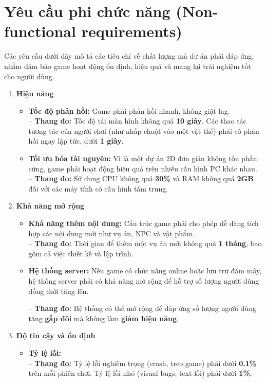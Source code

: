 \section{Yêu cầu phi chức năng (Non-functional requirements)}
Các yêu cầu dưới đây mô tả các tiêu chí về chất lượng mà dự án phải đáp ứng, nhằm đảm bảo game hoạt động ổn định, hiệu quả và mang lại trải nghiệm tốt cho người dùng.

\begin{enumerate}
    \item \textbf{Hiệu năng}
    \begin{itemize}
        \item \textbf{Tốc độ phản hồi:} 
        Game phải phản hồi nhanh, không giật lag. \\
        -- \textbf{Thang đo:} 
        Tốc độ tải màn hình không quá \textbf{10 giây}. Các thao tác tương tác của người chơi (như nhấp chuột vào một vật thể) phải có phản hồi ngay lập tức, dưới \textbf{1 giây}.

        \item \textbf{Tối ưu hóa tài nguyên:}
        Vì là một dự án 2D đơn giản không tốn phần cứng, game phải hoạt động hiệu quả trên nhiều cấu hình PC khác nhau. \\
        -- \textbf{Thang đo:}
        Sử dụng CPU không quá \textbf{30\%} và RAM không quá \textbf{2GB} đối với các máy tính có cấu hình tầm trung.
    \end{itemize}

    \item \textbf{Khả năng mở rộng}
    \begin{itemize}
        \item \textbf{Khả năng thêm nội dung:}
        Cấu trúc game phải cho phép dễ dàng tích hợp các nội dung mới như vụ án, NPC và vật phẩm. \\
        -- \textbf{Thang đo:} Thời gian để thêm một vụ án mới không quá \textbf{1 tháng}, bao gồm cả việc thiết kế và lập trình.

        \item \textbf{Hệ thống server:}
        Nếu game có chức năng online hoặc lưu trữ đám mây, hệ thống server phải có khả năng mở rộng để hỗ trợ số lượng người dùng đồng thời tăng lên.

        -- \textbf{Thang đo:} Hệ thống có thể mở rộng để đáp ứng số lượng người dùng tăng \textbf{gấp đôi} mà không làm \textbf{giảm hiệu năng}.
    \end{itemize}

    \item \textbf{Độ tin cậy và ổn định}
    \begin{itemize}
        \item \textbf{Tỷ lệ lỗi:} \\
        -- \textbf{Thang đo:} Tỷ lệ lỗi nghiêm trọng (crash, treo game) phải dưới \textbf{0.1\%} trên mỗi phiên chơi. Tỷ lệ lỗi nhỏ (visual bugs, text lỗi) phải dưới \textbf{1\%}.


\end{itemize}
\end{enumerate}
